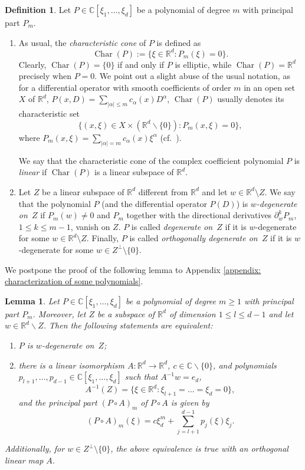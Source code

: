 \documentclass[a4paper,10pt]{amsart}
\newtheorem{lemma}[theorem]{Lemma}
\newtheorem*{crucial lemma}{Lemma \ref{lem:nice polynomial2}}
\theoremstyle{definition}
\newtheorem{definition}[theorem]{Definition}
\newcommand{\R}{\mathbb{R}}
\newcommand{\C}{\mathbb{C}}
\newcommand{\charcone}{\operatorname{Char}}
\newcommand{\wniceon}[2]{$#1$-degenerate on~#2}
\newcommand{\niceon}[1]{degenerate on~#1}
\newcommand{\veryniceon}[1]{orthogonally degenerate on~#1}
\begin{document}
\begin{definition}
    Let $P\in\C[\xi_1,\ldots,\xi_d]$ be a polynomial of degree $m$ with principal part $P_m$.
    \begin{enumerate}
        \item[(i)] As usual, the \emph{characteristic cone} of $P$ is defined as
        \[\charcone(P):=\{\xi\in\R^d \colon P_m(\xi)=0\}.\]
        Clearly, $\charcone(P)=\{0\}$ if and only if $P$ is elliptic, while $\charcone(P)=\R^d$ precisely when $P=0$. We point out a slight abuse of the usual notation, as for a differential operator with smooth coefficients of order $m$ in an open set $X$ of $\R^d$, $P(x,D)=\sum_{|\alpha|\leq m}c_\alpha(x)D^\alpha$, $\charcone (P)$ usually denotes its characteristic set
        \[\{(x,\xi)\in X\times\left(\R^d\backslash\{0\}\right) \colon P_m(x,\xi)=0\},\]
        where $P_m(x,\xi)=\sum_{|\alpha|= m}c_\alpha(x) \xi^\alpha$ (cf.~\cite[Theorem 8.3.1]{Hor1}).

        We say that the characteristic cone of the complex coefficient polynomial $P$ is \emph{linear} if $\charcone(P)$ is a linear subspace of $\R^d$.

        \item[(ii)] Let $Z$ be a linear subspace of $\R^d$ different from $\R^d$ and let $w\in \R^d\setminus Z$. We say that the polynomial $P$ (and the differential operator $P(D)$) is \emph{\wniceon{w}{$Z$}} if $P_m(w)\neq 0$ and $P_m$ together with the directional derivatives $\partial^k_w P_m$, $1\leq k\leq m-1$, vanish on $Z$. $P$ is called \emph{\niceon{$Z$}} if it is $w$-degenerate for some $w\in \R^d\setminus Z$. Finally, $P$ is called \emph{\veryniceon{$Z$}} if it is $w$-degenerate for some $w\in Z^\perp\setminus\{0\}$.   
    \end{enumerate} 
\end{definition}

We postpone the proof of the following lemma to Appendix \ref{appendix: characterization of some polynomials}.

\begin{lemma}\label{lem:nice polynomial2}
	Let $P\in\C[\xi_1,\ldots,\xi_d]$ be a polynomial of degree $m\geq1$ with principal part $P_m$. Moreover, let $Z$ be a subspace of $\R^d$ of dimension $1\leq l\leq d-1$ and let $w\in \R^d\backslash Z$. Then the following statements are equivalent:
    \begin{enumerate}
        \item[\upshape{(i)}] 
	    $P$ is \wniceon{w}{$Z$};
	   \item[\upshape{(ii)}] there is a linear isomorphism $A:\R^d\rightarrow\R^d$,  $c\in\C\backslash\{0\}$, and polynomials $p_{l+1},\ldots,p_{d-1}\in\C[\xi_1,\ldots,\xi_d]$ such that $A^{-1}w=e_d$,
	\[A^{-1}(Z)=\{\xi\in\R^d\colon \xi_{l+1}=\ldots=\xi_d=0\},\]
    and the principal part $(P\circ A)_m$ of $P\circ A$ is given by
	\[(P\circ A)_m(\xi)=c\xi_d^m + \sum_{j=l+1}^{d-1}p_j(\xi)\xi_j.\] 
    \end{enumerate}
    Additionally, for $w\in Z^\perp\setminus\{0\}$, the above equivalence is true with an orthogonal linear map $A$.
\end{lemma}
\end{document}

